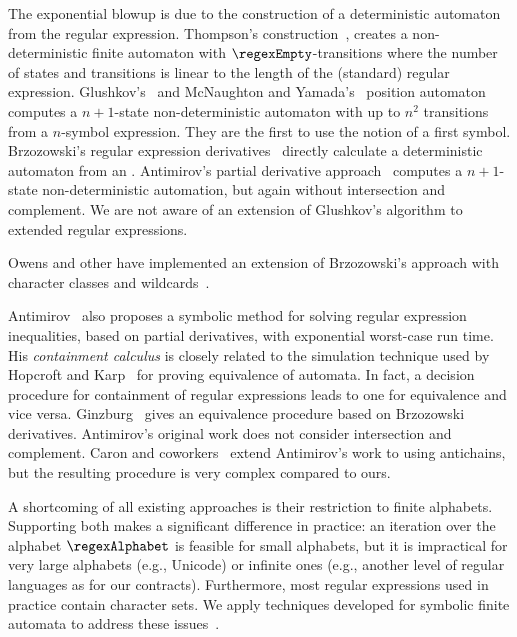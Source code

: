 The exponential blowup is due to the construction of a deterministic
automaton from the regular expression.
Thompson's construction~\cite{Thompson1968}, creates a
non-deterministic finite automaton with $\regexEmpty$-transitions
where the number of states and transitions is linear to the length of
the (standard) regular expression.
Glushkov's~\cite{Glushkov1961} and McNaughton and
Yamada's~\cite{McNaughtonYamada1960} position automaton computes a
$n+1$-state non-deterministic automaton with up to $n^2$ transitions from a $n$-symbol expression. They are the first to
use the notion of a first symbol.
Brzozowski's regular expression derivatives~\cite{Brzozowski1964} directly calculate a deterministic
automaton from an \ERE. Antimirov's partial derivative approach~\cite{Antimirov1996} computes a $n+1$-state 
non-deterministic automation, but again without intersection and complement. 
We are not aware of an extension of Glushkov's algorithm to extended regular expressions. 

Owens and other have implemented an extension of Brzozowski's approach with character classes and
wildcards~\cite{OwensReppyTuron2009}. 

Antimirov~\cite{Antimirov1995} also proposes a symbolic method for solving regular expression inequalities, based on
partial derivatives, with exponential worst-case run time. His 
\emph{containment calculus} is closely related to the simulation technique used by Hopcroft and Karp~\cite{HopcroftKarp1971} for proving
equivalence of automata. In fact, a decision procedure for containment of regular expressions leads to one for
equivalence and vice versa.
Ginzburg~\cite{Ginzburg1967} gives an equivalence procedure based on
Brzozowski derivatives.
Antimirov's original work does not consider
intersection and complement. Caron and
coworkers~\cite{CaronChamparnaudMignot2011} extend Antimirov's work to
\ERE{} using antichains, but the resulting procedure is very complex compared to ours. 

A shortcoming of all existing approaches is their restriction to
finite alphabets. Supporting both
makes a significant difference in practice: an iteration over the
alphabet $\regexAlphabet$ is feasible for small alphabets, but it is
impractical for very large alphabets (e.g., Unicode) or infinite ones
(e.g., another level of regular languages as for our
contracts). Furthermore, most regular expressions used in practice
contain character sets. We apply techniques developed for symbolic
finite automata to address these issues~\cite{Veanes2013}.


